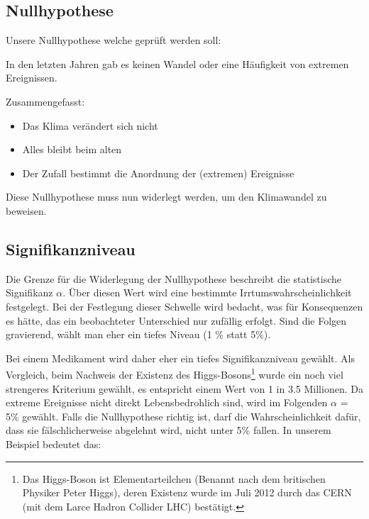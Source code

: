 \begin{refsection}
\subsection{Nullhypothese}
Unsere Nullhypothese welche geprüft werden soll:

In den letzten Jahren gab es keinen Wandel oder eine Häufigkeit von extremen Ereignissen. 

Zusammengefasst:
\begin{itemize}
\item Das Klima verändert sich nicht
\item Alles bleibt beim alten
\item Der Zufall bestimmt die Anordnung der (extremen) Ereignisse
\end{itemize}

Diese Nullhypothese muss nun widerlegt werden, um den Klimawandel zu beweisen.

\subsection{Signifikanzniveau}
Die Grenze für die Widerlegung der Nullhypothese beschreibt die statistische Signifikanz $\alpha$. Über diesen Wert wird eine bestimmte Irrtumswahrscheinlichkeit festgelegt.
Bei der Festlegung dieser Schwelle wird bedacht, was für Konsequenzen es hätte, das ein beobachteter Unterschied nur zufällig erfolgt. Sind die Folgen gravierend, wählt man eher ein tiefes Niveau (1 \% statt 5\%).

Bei einem Medikament wird daher eher ein tiefes Signifikanzniveau gewählt. Als Vergleich, beim Nachweis der Existenz des Higgs-Bosons\footnote{%
Das Higgs-Boson ist Elementarteilchen (Benannt nach dem britischen Physiker Peter Higgs), deren Existenz wurde im Juli 2012 durch das CERN (mit dem Larce Hadron Collider LHC) bestätigt.} wurde ein noch viel strengeres Kriterium gewählt, es entspricht einem Wert von 1 in 3.5 Millionen. Da extreme Ereignisse nicht direkt Lebensbedrohlich sind, wird im Folgenden $\alpha$ = 5\% gewählt.
Falls die Nullhypothese richtig ist, darf die Wahrscheinlichkeit dafür, dass sie fälschlicherweise abgelehnt wird, nicht unter 5\% fallen.
In unserem Beispiel bedeutet das:



\end{refsection}
